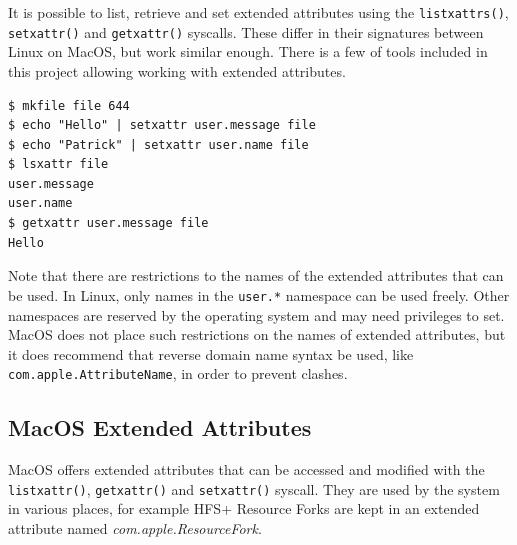 \documentclass[a4paper]{article}
\begin{document}


It is possible to list, retrieve and set extended attributes using the \verb|listxattrs()|, \verb|setxattr()| and \verb|getxattr()| syscalls. These differ in their signatures between Linux on MacOS, but work similar enough. There is a few of tools included in this project allowing working with extended attributes.

\begin{verbatim}
$ mkfile file 644
$ echo "Hello" | setxattr user.message file
$ echo "Patrick" | setxattr user.name file
$ lsxattr file
user.message
user.name
$ getxattr user.message file
Hello
\end{verbatim}
Note that there are restrictions to the names of the extended attributes that can be used. In Linux, only names in the \verb|user.*| namespace can be used freely. Other namespaces are reserved by the operating system and may need privileges to set. MacOS does not place such restrictions on the names of extended attributes, but it does recommend that reverse domain name syntax be used, like \verb|com.apple.AttributeName|, in order to prevent clashes.

\subsection{MacOS Extended Attributes}


MacOS offers extended attributes that can be accessed and modified with the \verb|listxattr()|, \verb|getxattr()| and \verb|setxattr()| syscall. They are used by the system in various places, for example HFS+ Resource Forks are kept in an extended attribute named \emph{com.apple.ResourceFork}.
\end{document}
